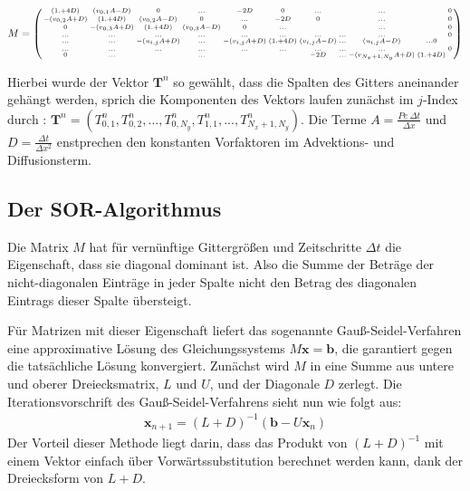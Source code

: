 \begin{align}
M=\left(\begin{medsize}\begin{smallmatrix}
(1.+4D)      & (v_{0,1}A-D) & 0          & ...       & -2D       & 0        &...       &&...       &&0    \\
-(v_{0,2}A+D) & (1.+4D)      & (v_{0,2}A-D) & 0         & ...      & -2D       &0       &&...       &&0    \\
0          &-(v_{0,3}A+D)  & (1.+4D)      &(v_{0,3}A-D) &0         &...       &       & &...       &&0 \\
...          & ...        &...         &...        &...       &...       &...       &...&...       &&0\\
...          &  ...       &-(u_{i,j}A+D)  &...        &-(v_{i,j}A+D)&(1.+4D)     &(v_{i,j}A-D)& ...      & (u_{i,j}A-D)&... 0\\
    ...         & ...        &...         &...        &...       &...       &...       &...&...       &&0\\
0          &...         &            &...        &           &         &-2D          &...       &-(v_{N_x+1,N_y}A+D) &(1.+4D)
\end{smallmatrix}\end{medsize}\right)\label{Gl:Matrix}
\end{align}



Hierbei wurde der Vektor $\boldsymbol T^n$ so gewählt, dass die Spalten des Gitters aneinander gehängt werden, sprich die Komponenten des Vektors laufen zunächst im $j$-Index durch : $\boldsymbol T^n = \left( T^n_{0,1}, T^n_{0,2}, ..., T^n_{0,N_y}, T^n_{1,1},...,T^n_{N_x+1,N_y} \right)$.
Die Terme $A=\frac{Pe~\Delta t}{\Delta x}$ und $D=\frac{\Delta t}{\Delta x^2}$ enstprechen den konstanten Vorfaktoren im Advektions- und Diffusionsterm.

\subsection{Der SOR-Algorithmus}
Die Matrix $M$ hat für vernünftige Gittergrößen und Zeitschritte $\Delta t$ die Eigenschaft, dass sie diagonal dominant ist. Also die Summe der Beträge der nicht-diagonalen Einträge in jeder Spalte nicht den Betrag des diagonalen Eintrags dieser Spalte übersteigt.

Für Matrizen mit dieser Eigenschaft liefert das sogenannte Gauß-Seidel-Verfahren eine approximative Lösung des Gleichungssystems $ M\boldsymbol x = \boldsymbol b$, die garantiert gegen die tatsächliche Lösung konvergiert.
Zunächst wird $M$ in eine Summe aus untere und oberer Dreiecksmatrix, $L$ und $U$, und der Diagonale $D$ zerlegt. Die Iterationsvorschrift des Gauß-Seidel-Verfahrens sieht nun wie folgt aus:
\begin{align}
  \boldsymbol x_{n+1} = (L+D)^{-1}(\boldsymbol b - U\boldsymbol x_{n}) \label{eq:gss}
\end{align}
Der Vorteil dieser Methode liegt darin, dass das Produkt von $(L+D)^{-1}$ mit einem Vektor einfach über Vorwärtssubstitution berechnet werden kann, dank der Dreiecksform von $L+D$.

